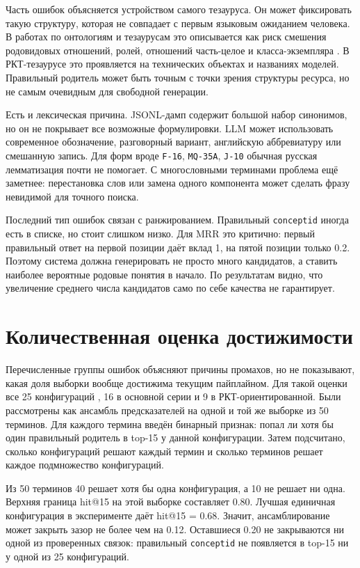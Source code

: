 \documentclass[12pt,a4paper,oneside,openany]{report}
\begin{document}
Часть ошибок объясняется устройством самого тезауруса. Он может фиксировать такую структуру, которая не совпадает с первым языковым ожиданием человека. В работах по онтологиям и тезаурусам это описывается как риск смешения родовидовых отношений, ролей, отношений часть-целое и класса-экземпляра \cite{louk2010,ontotez2006}. В РКТ-тезаурусе это проявляется на технических объектах и названиях моделей. Правильный родитель может быть точным с точки зрения структуры ресурса, но не самым очевидным для свободной генерации.

Есть и лексическая причина. JSONL-дамп содержит большой набор синонимов, но он не покрывает все возможные формулировки. LLM может использовать современное обозначение, разговорный вариант, английскую аббревиатуру или смешанную запись. Для форм вроде \texttt{F-16}, \texttt{MQ-35A}, \texttt{J-10} обычная русская лемматизация почти не помогает. С многословными терминами проблема ещё заметнее: перестановка слов или замена одного компонента может сделать фразу невидимой для точного поиска.

Последний тип ошибок связан с ранжированием. Правильный \texttt{conceptid} иногда есть в списке, но стоит слишком низко. Для MRR это критично: первый правильный ответ на первой позиции даёт вклад 1, на пятой позиции только 0.2. Поэтому система должна генерировать не просто много кандидатов, а ставить наиболее вероятные родовые понятия в начало. По результатам видно, что увеличение среднего числа кандидатов само по себе качества не гарантирует.

\section{Количественная оценка достижимости}

Перечисленные группы ошибок объясняют причины промахов, но не показывают, какая доля выборки вообще достижима текущим пайплайном. Для такой оценки все 25 конфигураций , 16 в основной серии и 9 в РКТ-ориентированной. Были рассмотрены как ансамбль предсказателей на одной и той же выборке из 50 терминов. Для каждого термина введён бинарный признак: попал ли хотя бы один правильный родитель в top-15 у данной конфигурации. Затем подсчитано, сколько конфигураций решают каждый термин и сколько терминов решает каждое подмножество конфигураций.

Из 50 терминов 40 решает хотя бы одна конфигурация, а 10 не решает ни одна. Верхняя граница hit@15 на этой выборке составляет 0.80. Лучшая единичная конфигурация в эксперименте даёт hit@15 = 0.68. Значит, ансамблирование может закрыть зазор не более чем на 0.12. Оставшиеся 0.20 не закрываются ни одной из проверенных связок: правильный \texttt{conceptid} не появляется в top-15 ни у одной из 25 конфигураций.
\end{document}
